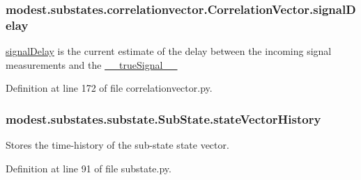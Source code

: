 \subsubsection[{\texorpdfstring{signal\+Delay}{signalDelay}}]{\setlength{\rightskip}{0pt plus 5cm}modest.\+substates.\+correlationvector.\+Correlation\+Vector.\+signal\+Delay}\hypertarget{classmodest_1_1substates_1_1correlationvector_1_1CorrelationVector_aa1565b9972d60149f335e3b923cac371}{}\label{classmodest_1_1substates_1_1correlationvector_1_1CorrelationVector_aa1565b9972d60149f335e3b923cac371}


\hyperlink{classmodest_1_1substates_1_1correlationvector_1_1CorrelationVector_aa1565b9972d60149f335e3b923cac371}{signal\+Delay} is the current estimate of the delay between the incoming signal measurements and the \hyperlink{classmodest_1_1substates_1_1correlationvector_1_1CorrelationVector_af2f52cea1c695f36dd100f529c322e94}{\+\_\+\+\_\+true\+Signal\+\_\+\+\_\+} 



Definition at line 172 of file correlationvector.\+py.

\subsubsection[{\texorpdfstring{state\+Vector\+History}{stateVectorHistory}}]{\setlength{\rightskip}{0pt plus 5cm}modest.\+substates.\+substate.\+Sub\+State.\+state\+Vector\+History\hspace{0.3cm}{\ttfamily [inherited]}}\hypertarget{classmodest_1_1substates_1_1substate_1_1SubState_a38c12c9d0899bc1161f3502b584517a2}{}\label{classmodest_1_1substates_1_1substate_1_1SubState_a38c12c9d0899bc1161f3502b584517a2}


Stores the time-\/history of the sub-\/state state vector. 



Definition at line 91 of file substate.\+py.

